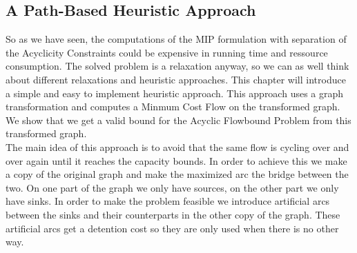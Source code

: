 \newpage
\subsection{A Path-Based Heuristic Approach}

So as we have seen, the computations of the MIP formulation with separation of the Acyclicity Constraints could be 
expensive in running time and ressource consumption. The solved problem is a relaxation anyway, so we can as well think 
about different relaxations and heuristic approaches. This chapter will introduce a simple and easy to 
implement heuristic approach. This approach uses a graph transformation and computes a Minmum Cost Flow on the 
transformed graph. We show that we get a valid bound for the Acyclic Flowbound Problem from this transformed graph.\\

The main idea of this approach is to avoid that the same flow is cycling over and over again until it reaches the 
capacity bounds. In order to achieve this we make a copy of the original graph and make the maximized arc the bridge 
between the two. On one part of the graph we only have sources, on the other part we only have sinks. In order to make 
the problem feasible we introduce artificial arcs between the sinks and their counterparts in the other copy of the 
graph. These artificial arcs get a detention cost so they are only used when there is no other way.